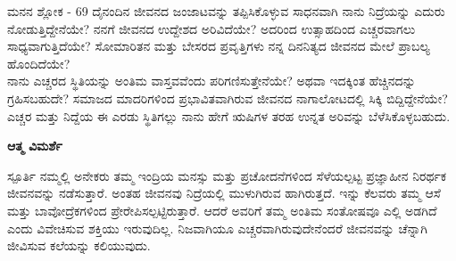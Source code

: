 \begin{mananam}{\kanfont ಮನನ ಶ್ಲೋಕ - \textenglish{69}}
\footnotesize \mananamfont ದೈನಂದಿನ ಜೀವನದ ಜಂಜಾಟವನ್ನು ತಪ್ಪಿಸಿಕೊಳ್ಳುವ ಸಾಧನವಾಗಿ ನಾನು ನಿದ್ರೆಯನ್ನು ಎದುರು ನೋಡುತ್ತಿದ್ದೇನೆಯೇ? ನನಗೆ ಜೀವನದ ಉದ್ದೇಶದ ಅರಿವಿದೆಯೇ? ಅದರಿಂದ ಉತ್ಸಾಹದಿಂದ ಎಚ್ಚರವಾಗಲು ಸಾಧ್ಯವಾಗುತ್ತಿದೆಯೇ? ಸೋಮಾರಿತನ ಮತ್ತು ಬೇಸರದ ಪ್ರವೃತ್ತಿಗಳು ನನ್ನ ದಿನನಿತ್ಯದ ಜೀವನದ ಮೇಲೆ ಪ್ರಾಬಲ್ಯ ಹೊಂದಿದೆಯೇ?\\
 ನಾನು ಎಚ್ಚರದ ಸ್ಥಿತಿಯನ್ನು ಅಂತಿಮ ವಾಸ್ತವವೆಂದು ಪರಿಗಣಿಸುತ್ತೇನೆಯೇ? ಅಥವಾ ಇದಕ್ಕಿಂತ ಹೆಚ್ಚಿನದನ್ನು ಗ್ರಹಿಸಬಹುದೇ? ಸಮಾಜದ ಮಾದರಿಗಳಿಂದ ಪ್ರಭಾವಿತವಾಗಿರುವ ಜೀವನದ ನಾಗಾಲೋಟದಲ್ಲಿ ಸಿಕ್ಕಿ ಬಿದ್ದಿದ್ದೇನೆಯೇ? ಎಚ್ಚರ ಮತ್ತು ನಿದ್ದೆಯ ಈ ಎರಡು ಸ್ಥಿತಿಗಲ್ಲು ನಾನು ಹೇಗೆ ಋಷಿಗಳ ತರಹ ಉನ್ನತ ಅರಿವನ್ನು ಬೆಳೆಸಿಕೊಳ್ಳಬಹುದು.
\end{mananam}
\WritingHand\enspace\textbf{ಆತ್ಮ ವಿಮರ್ಶೆ}
\begin{inspiration}{\kanfont ಸ್ಪೂರ್ತಿ}
\footnotesize \mananamfont ನಮ್ಮಲ್ಲಿ ಅನೇಕರು ತಮ್ಮ ಇಂದ್ರಿಯ ಮನಸ್ಸು ಮತ್ತು ಪ್ರಚೋದನೆಗಳಿಂದ ಸೆಳೆಯಲ್ಪಟ್ಟ ಪ್ರಜ್ಞಾಹೀನ ನಿರರ್ಥಕ   ಜೀವನವನ್ನು ನಡೆಸುತ್ತಾರೆ. ಅಂತಹ ಜೀವನವು ನಿದ್ರೆಯಲ್ಲಿ  ಮುಳುಗಿರುವ ಹಾಗಿರುತ್ತದೆ. ಇನ್ನು ಕೆಲವರು ತಮ್ಮ ಆಸೆ ಮತ್ತು ಬಾವೋದ್ರೆಕಗಳಿಂದ ಪ್ರೇರೇಪಿಸಲ್ಪಟ್ಟಿರುತ್ತಾರೆ. ಆದರೆ ಅವರಿಗೆ ತಮ್ಮ ಅಂತಿಮ ಸಂತೋಷವೂ ಎಲ್ಲಿ ಅಡಗಿದೆ ಎಂದು ವಿವೇಚಿಸುವ ಶಕ್ತಿಯು ಇರುವುದಿಲ್ಲ. ನಿಜವಾಗಿಯೂ ಎಚ್ಚರವಾಗಿರುವುದೇನೆಂದರೆ ಜೀವನವನ್ನು ಚೆನ್ನಾಗಿ ಜೀವಿಸುವ ಕಲೆಯನ್ನು ಕಲಿಯುವುದು.
\end{inspiration}
\newpage


